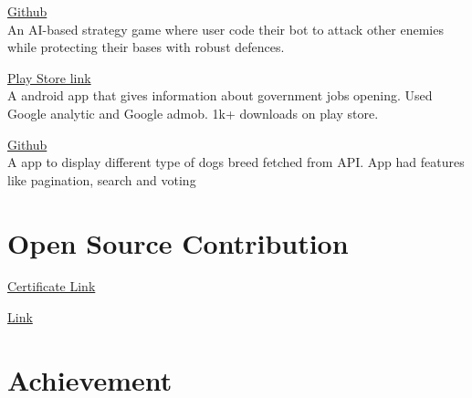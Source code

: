 \documentclass[]{deedy-resume-openfont}
\begin{document}
\begin{minipage}[t]{0.69\textwidth}
\hfill \href{https://github.com/delta/codecharacter-web-2022}{Github}\\
An AI-based strategy game where user code their bot to attack other enemies while protecting their bases with robust defences.\\
\sectionsep

\hfill \href{https://play.google.com/store/apps/details?id=com.amostrone.akash.sanjeevwebsolutions}{Play Store link}\\
A android app that gives information about government jobs opening. Used Google analytic and Google admob. 1k+ downloads on play store.\\
\sectionsep

\hfill \href{https://github.com/jaiakash/Pawsome}{Github}\\
A app to display different type of dogs breed fetched from API. App had features like pagination, search and voting\\
\sectionsep

%
%

\section{Open Source Contribution}
\href{https://kossiitkgp.org/public-files/KWoC/2021-Certificates/Student/jaiakash.pdf
}{Certificate Link}


\href{https://github.com/interviewstreet/ghs/pull/5
}{Link}

%
%
\section{Achievement}


\

\

\

\sectionsep
\end{minipage} 
\ 
\end{document}
